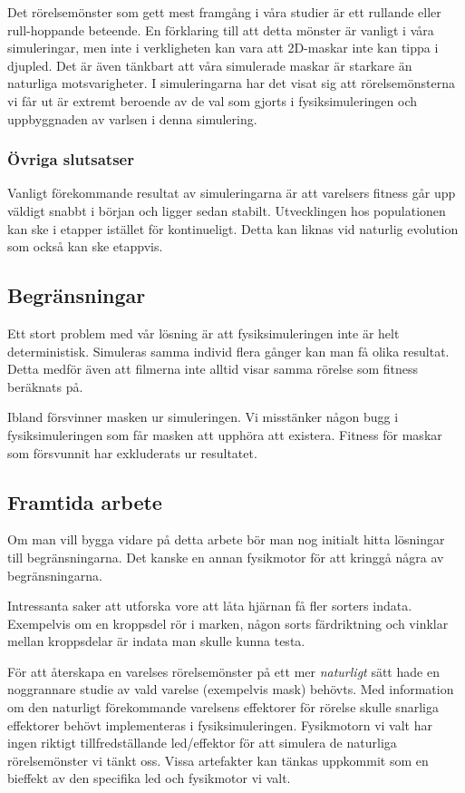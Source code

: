\documentclass[titlepage, twocolumn, a4paper, 11pt, swedish]{article}
\begin{document}
Det rörelsemönster som gett mest framgång i våra studier är ett rullande eller rull-hoppande beteende. En förklaring till att detta mönster är vanligt i våra simuleringar, men inte i verkligheten kan vara att 2D-maskar inte kan tippa i djupled. Det är även tänkbart att våra simulerade maskar är starkare än naturliga motsvarigheter. I simuleringarna har det visat sig att rörelsemönsterna vi får ut är extremt beroende av de val som gjorts i fysiksimuleringen och uppbyggnaden av varlsen i denna simulering. 

\subsubsection{Övriga slutsatser}
Vanligt förekommande resultat av simuleringarna är att varelsers fitness går upp väldigt snabbt i början och ligger sedan stabilt. Utvecklingen hos populationen kan ske i etapper istället för kontinueligt. Detta kan liknas vid naturlig evolution som också kan ske etappvis.

\subsection{Begränsningar}
Ett stort problem med vår lösning är att fysiksimuleringen inte är helt deterministisk. Simuleras samma individ flera gånger kan man få olika resultat. Detta medför även att filmerna inte alltid visar samma rörelse som fitness beräknats på.

Ibland försvinner masken ur simuleringen. Vi misstänker någon bugg i fysiksimuleringen som får masken att upphöra att existera. Fitness för maskar som försvunnit har exkluderats ur resultatet. 

\subsection{Framtida arbete}
Om man vill bygga vidare på detta arbete bör man nog initialt hitta lösningar till begränsningarna. Det kanske en annan fysikmotor för att kringgå några av begränsningarna. 

Intressanta saker att utforska vore att låta hjärnan få fler sorters indata. Exempelvis om en kroppsdel rör i marken, någon sorts färdriktning och vinklar mellan kroppsdelar är indata man skulle kunna testa.

För att återskapa en varelses rörelsemönster på ett mer \textit{naturligt} sätt hade en noggrannare studie av vald varelse (exempelvis mask) behövts. Med information om den naturligt förekommande varelsens effektorer för rörelse skulle snarliga effektorer behövt implementeras i fysiksimuleringen. Fysikmotorn vi valt har ingen riktigt tillfredställande led/effektor för att simulera de naturliga rörelsemönster vi tänkt oss. Vissa artefakter kan tänkas uppkommit som en bieffekt av den specifika led och fysikmotor vi valt.
\end{document}
